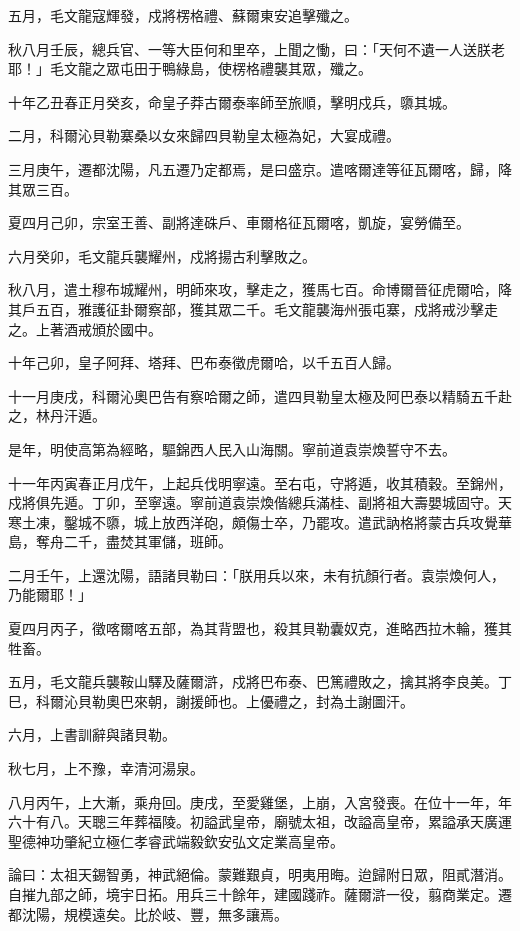 \begin{pinyinscope}
五月，毛文龍寇輝發，戍將楞格禮、蘇爾東安追擊殲之。

秋八月壬辰，總兵官、一等大臣何和里卒，上聞之慟，曰：「天何不遺一人送朕老耶！」毛文龍之眾屯田于鴨綠島，使楞格禮襲其眾，殲之。

十年乙丑春正月癸亥，命皇子莽古爾泰率師至旅順，擊明戍兵，隳其城。

二月，科爾沁貝勒寨桑以女來歸四貝勒皇太極為妃，大宴成禮。

三月庚午，遷都沈陽，凡五遷乃定都焉，是曰盛京。遣喀爾達等征瓦爾喀，歸，降其眾三百。

夏四月己卯，宗室王善、副將達硃戶、車爾格征瓦爾喀，凱旋，宴勞備至。

六月癸卯，毛文龍兵襲耀州，戍將揚古利擊敗之。

秋八月，遣土穆布城耀州，明師來攻，擊走之，獲馬七百。命博爾晉征虎爾哈，降其戶五百，雅護征卦爾察部，獲其眾二千。毛文龍襲海州張屯寨，戍將戒沙擊走之。上著酒戒頒於國中。

十年己卯，皇子阿拜、塔拜、巴布泰徵虎爾哈，以千五百人歸。

十一月庚戌，科爾沁奧巴告有察哈爾之師，遣四貝勒皇太極及阿巴泰以精騎五千赴之，林丹汗遁。

是年，明使高第為經略，驅錦西人民入山海關。寧前道袁崇煥誓守不去。

十一年丙寅春正月戊午，上起兵伐明寧遠。至右屯，守將遁，收其積穀。至錦州，戍將俱先遁。丁卯，至寧遠。寧前道袁崇煥偕總兵滿桂、副將祖大壽嬰城固守。天寒土凍，鑿城不隳，城上放西洋砲，頗傷士卒，乃罷攻。遣武訥格將蒙古兵攻覺華島，奪舟二千，盡焚其軍儲，班師。

二月壬午，上還沈陽，語諸貝勒曰：「朕用兵以來，未有抗顏行者。袁崇煥何人，乃能爾耶！」

夏四月丙子，徵喀爾喀五部，為其背盟也，殺其貝勒囊奴克，進略西拉木輪，獲其牲畜。

五月，毛文龍兵襲鞍山驛及薩爾滸，戍將巴布泰、巴篤禮敗之，擒其將李良美。丁巳，科爾沁貝勒奧巴來朝，謝援師也。上優禮之，封為土謝圖汗。

六月，上書訓辭與諸貝勒。

秋七月，上不豫，幸清河湯泉。

八月丙午，上大漸，乘舟回。庚戌，至愛雞堡，上崩，入宮發喪。在位十一年，年六十有八。天聰三年葬福陵。初謚武皇帝，廟號太祖，改謚高皇帝，累謚承天廣運聖德神功肇紀立極仁孝睿武端毅欽安弘文定業高皇帝。

論曰：太祖天錫智勇，神武絕倫。蒙難艱貞，明夷用晦。迨歸附日眾，阻貳潛消。自摧九部之師，境宇日拓。用兵三十餘年，建國踐祚。薩爾滸一役，翦商業定。遷都沈陽，規模遠矣。比於岐、豐，無多讓焉。


\end{pinyinscope}